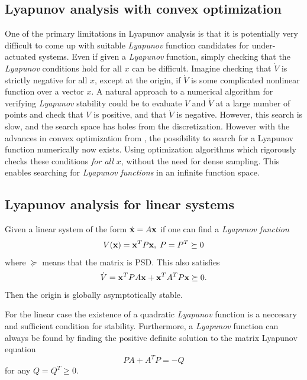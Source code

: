 \subsection{Lyapunov analysis with convex optimization}
\label{subsec:Lyapunov analysis with convex optimization}

One of the primary limitations in Lyapunov analysis is that it is potentially
very difficult to come up with suitable \textit{Lyapunov} function candidates
for under-actuated systems. Even if given a \textit{Lyapunov} function, simply
checking that the \textit{Lyapunov} conditions hold for all \(x\) can be
difficult. Imagine checking that \(\dot{V}\) is strictly negative for all \(x\),
except at the origin, if \(\dot{V}\) is some complicated nonlinear function over
a vector \(x\). A natural approach to a numerical algorithm for verifying
\textit{Lyapunov} stability could be to evaluate \(V\) and \(\dot{V}\) at a
large number of points and check that \(V\) is positive, and that \(\dot{V}\) is
negative. However, this search is slow, and the search space has holes from the
discretization. However with the advances in convex optimization from
\cite{parilloStructuredSemidefinitePrograms}, the possibility to search for a
Lyapunov function numerically now exists. Using optimization algorithms which
rigorously checks these conditions \textit{for all \(x\)}, without the need for
dense sampling. This enables searching for \textit{Lyapunov functions} in an
infinite function space.

\subsection{Lyapunov analysis for linear systems}
\label{subsec:Lyapunov analysis for linear systems}

\begin{theorem}
  Given a linear system of the form \(\dot{\mathbf{x}} = A\mathbf{x}\) if one can
  find a \textit{Lyapunov function}
  \[
    V(\mathbf{x}) = \mathbf{x}^{T}P\mathbf{x}, \; P = P^{T} \succeq 0
  \]
  where \(\succeq\) means that the matrix is \ac{PSD}. This also satisfies
  \[
    \dot{V} = \mathbf{x}^{T}PA\mathbf{x} + \mathbf{x}^{T}A^{T}P\mathbf{x} \succeq 0.
  \]
  Then the origin is globally asymptotically stable.
\end{theorem}

For the linear case the existence of a quadratic \textit{Lyapunov} function is a
neccesary and sufficient condition for stability. Furthermore, a
\textit{Lyapunov} function can always be found by finding the positive definite
solution to the matrix Lyapunov equation
\begin{equation}
  \label{eqn:linearlyapunov}
  PA + A^{T}P = -Q
\end{equation}
for any \(Q = Q^{T} \geqslant 0\).

